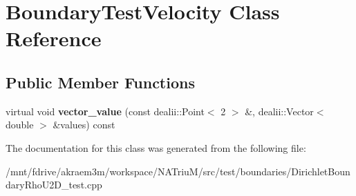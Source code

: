 \hypertarget{classBoundaryTestVelocity}{
\section{BoundaryTestVelocity Class Reference}
\label{classBoundaryTestVelocity}
}
\subsection*{Public Member Functions}
\begin{DoxyCompactItemize}
\item 
\hypertarget{classBoundaryTestVelocity_a224f3ce2233b916a920ca6c6791c5d67}{
virtual void {\bfseries vector\_\-value} (const dealii::Point$<$ 2 $>$ \&, dealii::Vector$<$ double $>$ \&values) const }
\label{classBoundaryTestVelocity_a224f3ce2233b916a920ca6c6791c5d67}

\end{DoxyCompactItemize}


The documentation for this class was generated from the following file:\begin{DoxyCompactItemize}
\item 
/mnt/fdrive/akraem3m/workspace/NATriuM/src/test/boundaries/DirichletBoundaryRhoU2D\_\-test.cpp\end{DoxyCompactItemize}
